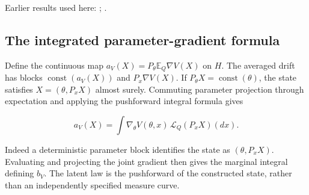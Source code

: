 \documentclass[11pt,a4paper]{report}
\begin{document}
Earlier results used here: \cite[Section~3.1.1]{LangevinLean2026IPLA}; \cite[Section~3.3.1]{LangevinLean2026IPLA}.
\subsection{\texorpdfstring{The integrated parameter-gradient formula}{The integrated parameter-gradient formula}}
\label{report-step-ProximalLangevin-MeanFieldProcess-lean-7}


Define the continuous map \(a_V(X)=P_\theta\mathbb E_Q\nabla V(X)\) on \(H\). The averaged drift has blocks \(\operatorname{const}(a_V(X))\) and \(P_x\nabla V(X)\). If \(P_\theta X=\operatorname{const}(\theta)\), the state satisfies \(X=(\theta,P_xX)\) almost surely. Commuting parameter projection through expectation and applying the pushforward integral formula gives

\[a_V(X)=\int\nabla_\theta V(\theta,x)\,\mathcal L_Q(P_xX)(dx).\]

Indeed a deterministic parameter block identifies the state as \((\theta,P_xX)\). Evaluating and projecting the joint gradient then gives the marginal integral defining \(b_V\). The latent law is the pushforward of the constructed state, rather than an independently specified measure curve.
\end{document}
